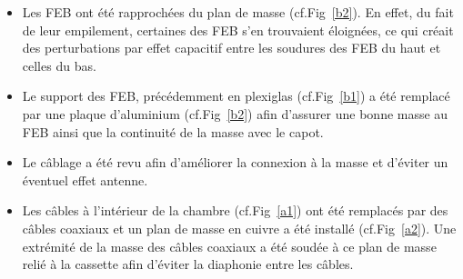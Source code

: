 \begin{itemize}[label=$\bullet$]
	\item Les FEB ont été rapprochées du plan de masse (cf.Fig~\ref{b2}). En effet, du fait de leur empilement, certaines des FEB s'en trouvaient éloignées, ce qui créait des perturbations par effet capacitif entre les soudures des FEB du haut et celles du bas.
	\item Le support des FEB, précédemment en plexiglas (cf.Fig~\ref{b1}) a été remplacé par une plaque d'aluminium (cf.Fig~\ref{b2}) afin d'assurer une bonne masse au FEB ainsi que la continuité de la masse avec le capot.
	\item Le câblage a été revu afin d'améliorer la connexion à la masse et d'éviter un éventuel effet antenne.
	\item Les câbles à l'intérieur de la chambre (cf.Fig~\ref{a1}) ont été remplacés par des câbles coaxiaux et un plan de masse en cuivre a été installé (cf.Fig~\ref{a2}). Une extrémité de la masse des câbles coaxiaux a été soudée à ce plan de masse relié à la cassette afin d'éviter la diaphonie entre les câbles.
\end{itemize}


